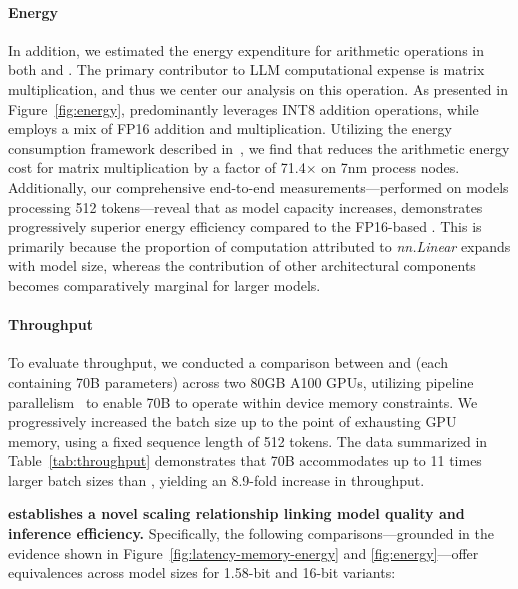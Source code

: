 \paragraph{Energy}

In addition, we estimated the energy expenditure for arithmetic operations in both  and . The primary contributor to LLM computational expense is matrix multiplication, and thus we center our analysis on this operation. As presented in Figure~\ref{fig:energy},  predominantly leverages INT8 addition operations, while  employs a mix of FP16 addition and multiplication. Utilizing the energy consumption framework described in~\cite{energycost, pokebnn}, we find that  reduces the arithmetic energy cost for matrix multiplication by a factor of 71.4$\times$ on 7nm process nodes. Additionally, our comprehensive end-to-end measurements—performed on models processing 512 tokens—reveal that as model capacity increases,  demonstrates progressively superior energy efficiency compared to the FP16-based . This is primarily because the proportion of computation attributed to \emph{nn.Linear} expands with model size, whereas the contribution of other architectural components becomes comparatively marginal for larger models.

\paragraph{Throughput}

To evaluate throughput, we conducted a comparison between  and  (each containing 70B parameters) across two 80GB A100 GPUs, utilizing pipeline parallelism~\cite{gpipe} to enable  70B to operate within device memory constraints. We progressively increased the batch size up to the point of exhausting GPU memory, using a fixed sequence length of 512 tokens. The data summarized in Table~\ref{tab:throughput} demonstrates that  70B accommodates up to 11 times larger batch sizes than , yielding an 8.9-fold increase in throughput.

\textbf{ establishes a novel scaling relationship linking model quality and inference efficiency.} Specifically, the following comparisons—grounded in the evidence shown in Figure~\ref{fig:latency-memory-energy} and \ref{fig:energy}—offer equivalences across model sizes for 1.58-bit and 16-bit variants:

